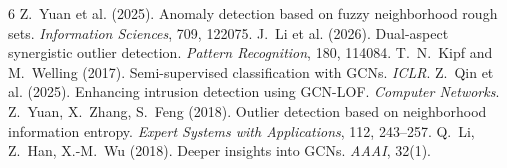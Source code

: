 \documentclass[11pt,a4paper,twocolumn]{article}
\begin{document}
\begin{thebibliography}{6}
 Z.~Yuan et al. (2025). Anomaly detection based on fuzzy neighborhood rough sets. \textit{Information Sciences}, 709, 122075.
 J.~Li et al. (2026). Dual-aspect synergistic outlier detection. \textit{Pattern Recognition}, 180, 114084.
 T.~N.~Kipf and M.~Welling (2017). Semi-supervised classification with GCNs. \textit{ICLR}.
 Z.~Qin et al. (2025). Enhancing intrusion detection using GCN-LOF. \textit{Computer Networks}.
 Z.~Yuan, X.~Zhang, S.~Feng (2018). Outlier detection based on neighborhood information entropy. \textit{Expert Systems with Applications}, 112, 243--257.
 Q.~Li, Z.~Han, X.-M.~Wu (2018). Deeper insights into GCNs. \textit{AAAI}, 32(1).
\end{thebibliography}
\end{document}
